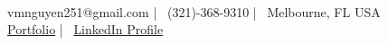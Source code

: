 \documentclass[]{awesome-cv}
\begin{document}
\begin{center}
	  \\
	\vspace{2mm}
	{\faEnvelope\ vmnguyen251@gmail.com} | {\faMobile\ (321)-368-9310} | {\faMapMarker\ Melbourne, FL USA} \\
	{{\faLink\ \href{https://n0k0m3.github.io/}{Portfolio} | \faLink\ \href{https://www.linkedin.com/in/minhnguyen251/}{LinkedIn Profile}}}
\end{center}
% 




% 
\
\end{document}
